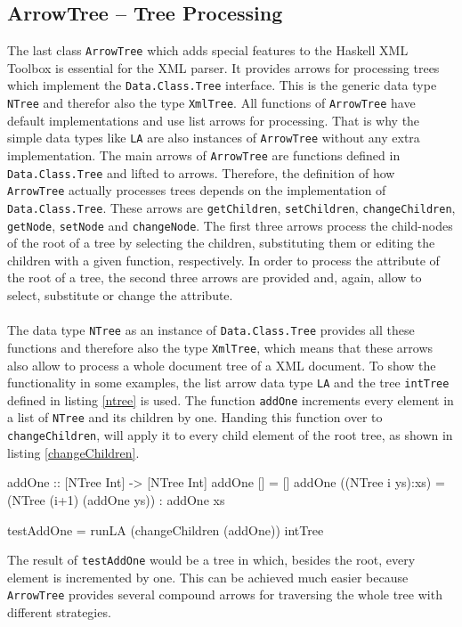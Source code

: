 \documentclass[11pt,a4paper,headsepline, bibtotoc]{scrreprt}
\begin{document}
\subsection{ArrowTree -- Tree Processing}
The last class \texttt{ArrowTree} which adds special features to the Haskell XML Toolbox is essential for the XML parser. It provides arrows for processing trees which implement the \texttt{Data.Class.Tree} interface. This is the generic data type \texttt{NTree} and therefor also the type \texttt{XmlTree}. All functions of \texttt{ArrowTree} have default implementations and use list arrows for processing. That is why the simple data types like \texttt{LA} are also instances of  \texttt{ArrowTree} without any extra implementation. The main arrows of \texttt{ArrowTree} are functions defined in \texttt{Data.Class.Tree} and lifted to arrows. Therefore, the definition of how \texttt{ArrowTree} actually processes trees depends on the implementation of \texttt{Data.Class.Tree}. These arrows are \texttt{getChildren}, \texttt{setChildren}, \texttt{changeChildren}, \texttt{getNode}, \texttt{setNode} and \texttt{changeNode}. The first three arrows process the child-nodes of the root of a tree by selecting the children, substituting them or editing the children with a given function, respectively. In order to process the attribute of the root of a tree, the second three arrows are provided and, again, allow to select, substitute or change the attribute.\\
\\
The data type \texttt{NTree} as an instance of \texttt{Data.Class.Tree} provides all these functions and therefore also the type \texttt{XmlTree}, which means that these arrows also allow to process a whole document tree of a XML document.
To show the functionality in some examples, the list arrow data type \texttt{LA} and the tree \texttt{intTree} defined in listing \ref{ntree} is used. The function \texttt{addOne} increments every element in a list of \texttt{NTree} and its children by one. Handing this function over to \texttt{changeChildren}, will apply it to every child element of the root tree, as shown in listing \ref{changeChildren}.
\begin{code}[caption=changeChildren Example, label=changeChildren]
addOne :: [NTree Int] -> [NTree Int]
addOne [] = []
addOne ((NTree i ys):xs) 
  = (NTree (i+1) (addOne ys)) : addOne xs

testAddOne = runLA (changeChildren (addOne)) intTree
\end{code}
The result of \texttt{testAddOne} would be a tree in which, besides the root, every element is incremented by one. This can be achieved much easier because \texttt{ArrowTree} provides several compound arrows for traversing the whole tree with different strategies.\\
\end{document}
